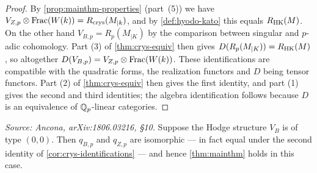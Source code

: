 \begin{proof}
  By \cref{prop:mainthm-properties} (part~(5))
  we have \(V_{Z,p} \otimes \mathrm{Frac}(W(k)) = R_{\mathrm{crys}}(M_{\vert k})\), and by
  \cref{def:hyodo-kato} this equals \(R_{\mathrm{HK}}(M)\). On the other hand
  \(V_{B,p} = R_p(M_{\vert K})\) by the comparison between singular and
  \(p\)-adic cohomology. Part (3) of \cref{thm:crys-equiv} then gives
  \(D(R_p(M_{\vert K})) = R_{\mathrm{HK}}(M)\), so altogether
  \(D(V_{B,p}) = V_{Z,p} \otimes \mathrm{Frac}(W(k))\). These identifications are
  compatible with the quadratic forms, the realization functors and \(D\) being
  tensor functors. Part (2) of \cref{thm:crys-equiv} then gives
  the first identity, and part (1) gives the second and third identities;
  the algebra identification follows because \(D\) is an equivalence of
  \(\mathbb{Q}_p\)-linear categories.
\end{proof}

\begin{proposition}
  \label{prop:ordinary-case}
  \textit{Source: Ancona, arXiv:1806.03216, \S10.}
  Suppose the Hodge structure \(V_B\) is of type \((0,0)\). Then \(q_{B,p}\) and
  \(q_{Z,p}\) are isomorphic --- in fact equal under the second identity of
  \cref{cor:crys-identifications} --- and hence \cref{thm:mainthm} holds in this
  case.
\end{proposition}

